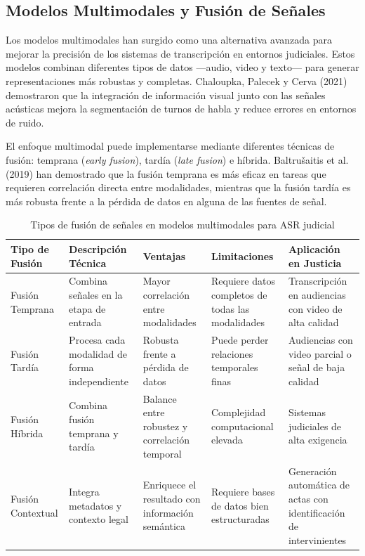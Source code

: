\documentclass[12pt,a4paper,oneside]{report}
\begin{document}
\subsection{Modelos Multimodales y Fusión de Señales}

Los modelos multimodales han surgido como una alternativa avanzada para mejorar la precisión de los sistemas de transcripción en entornos judiciales. Estos modelos combinan diferentes tipos de datos ---audio, video y texto--- para generar representaciones más robustas y completas. Chaloupka, Palecek y Cerva (2021) demostraron que la integración de información visual junto con las señales acústicas mejora la segmentación de turnos de habla y reduce errores en entornos de ruido.

El enfoque multimodal puede implementarse mediante diferentes técnicas de fusión: temprana (\textit{early fusion}), tardía (\textit{late fusion}) e híbrida. Baltrušaitis et al. (2019) han demostrado que la fusión temprana es más eficaz en tareas que requieren correlación directa entre modalidades, mientras que la fusión tardía es más robusta frente a la pérdida de datos en alguna de las fuentes de señal.

\begin{table}[H]
\centering
\caption{Tipos de fusión de señales en modelos multimodales para ASR judicial}
\begin{tabular}{|p{2.5cm}|p{3cm}|p{2.5cm}|p{2.5cm}|p{2.5cm}|}
\hline
\rowcolor{gray!20}
\textbf{Tipo de Fusión} & \textbf{Descripción Técnica} & \textbf{Ventajas} & \textbf{Limitaciones} & \textbf{Aplicación en Justicia} \\
\hline
Fusión Temprana & Combina señales en la etapa de entrada & Mayor correlación entre modalidades & Requiere datos completos de todas las modalidades & Transcripción en audiencias con video de alta calidad \\
\hline
Fusión Tardía & Procesa cada modalidad de forma independiente & Robusta frente a pérdida de datos & Puede perder relaciones temporales finas & Audiencias con video parcial o señal de baja calidad \\
\hline
Fusión Híbrida & Combina fusión temprana y tardía & Balance entre robustez y correlación temporal & Complejidad computacional elevada & Sistemas judiciales de alta exigencia \\
\hline
Fusión Contextual & Integra metadatos y contexto legal & Enriquece el resultado con información semántica & Requiere bases de datos bien estructuradas & Generación automática de actas con identificación de intervinientes \\
\hline
\end{tabular}
\label{tab:fusion}
\end{table}
\end{document}
